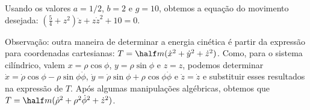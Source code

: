 \begin{question}
\begin{solution}
		Usando os valores $a = 1/2$, $b = 2$ e $g = 10$, obtemos a equação do movimento desejada:
		$(\frac{5}{4} + z^2)\ddot z + z\dot z^2 + 10 = 0$.

		Observação: outra maneira de determinar a energia cinética é partir da expressão para coordenadas cartesianas: $T = \half m (\dot x^2 + \dot y^2 + \dot z^2)$.
		Como, para o sistema cilíndrico, valem $x = \rho\cos\phi$, $y = \rho\sin\phi$ e $z = z$, podemos determinar $\dot x = \dot\rho \cos\phi - \rho\sin\phi \dot \phi$, $\dot y = \dot\rho \sin\phi + \rho\cos\phi \dot \phi$ e $\dot z = \dot z$ e substituir esses resultados na expressão de $T$. Após algumas manipulações algébricas, obtemos que $T = \half m (\dot\rho^2 + \rho^2\dot\phi^2 + \dot z^2)$. 
	\end{solution}
\end{question}